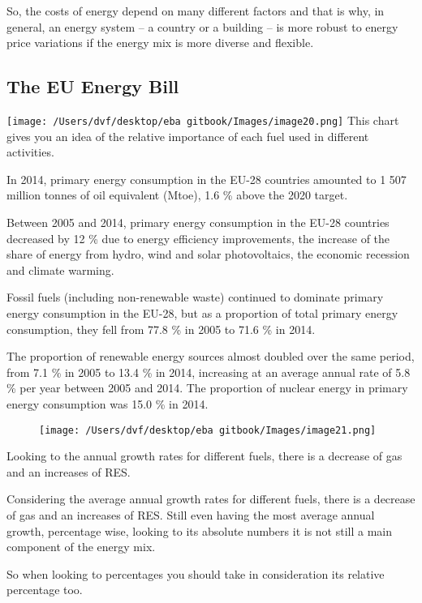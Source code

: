 \documentclass[]{book}
\theoremstyle{definition}
\theoremstyle{definition}
\theoremstyle{definition}
\theoremstyle{remark}
\begin{document}
So, the costs of energy depend on many different factors and that is
why, in general, an energy system -- a country or a building -- is more
robust to energy price variations if the energy mix is more diverse and
flexible.

\subsection{The EU Energy Bill}\label{the-eu-energy-bill}

\texttt{[image: /Users/dvf/desktop/eba gitbook/Images/image20.png]}
This chart gives you an idea of the relative importance of each fuel
used in different activities.

In 2014, primary energy consumption in the EU-28 countries amounted to 1
507 million tonnes of oil equivalent (Mtoe), 1.6 \% above the 2020
target.

Between 2005 and 2014, primary energy consumption in the EU-28 countries
decreased by 12 \% due to energy efficiency improvements, the increase
of the share of energy from hydro, wind and solar photovoltaics, the
economic recession and climate warming.

Fossil fuels (including non-renewable waste) continued to dominate
primary energy consumption in the EU-28, but as a proportion of total
primary energy consumption, they fell from 77.8 \% in 2005 to 71.6 \% in
2014.

The proportion of renewable energy sources almost doubled over the same
period, from 7.1 \% in 2005 to 13.4 \% in 2014, increasing at an average
annual rate of 5.8 \% per year between 2005 and 2014. The proportion of
nuclear energy in primary energy consumption was 15.0 \% in 2014.

\begin{figure}[htbp]
\centering
\texttt{[image: /Users/dvf/desktop/eba gitbook/Images/image21.png]}
\caption{}
\end{figure}

Looking to the annual growth rates for different fuels, there is a
decrease of gas and an increases of RES.

Considering the average annual growth rates for different fuels, there
is a decrease of gas and an increases of RES. Still even having the most
average annual growth, percentage wise, looking to its absolute numbers
it is not still a main component of the energy mix.

So when looking to percentages you should take in consideration its
relative percentage too.
\end{document}
